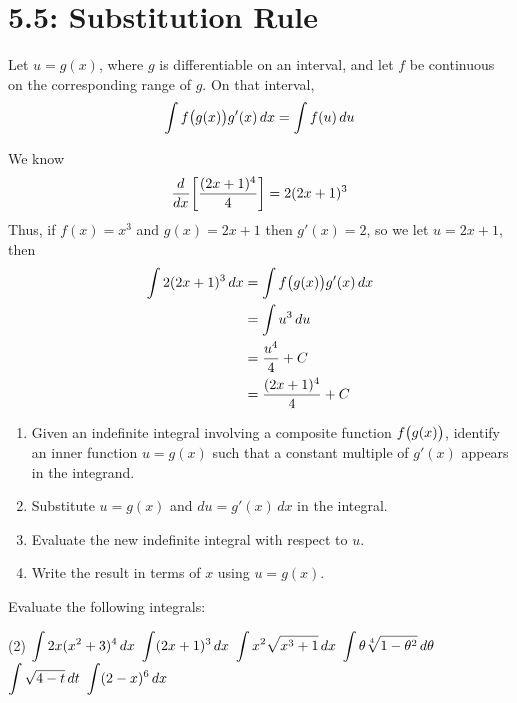 \documentclass[../mathNotesPreamble]{subfiles}
\begin{document}
\section{5.5: Substitution Rule}
\vspace*{-\baselineskip}
  \begin{thmBox*}
    Let $u=g(x)$, where $g$ is differentiable on an interval, and let $f$ be continuous on the corresponding range of $g$. On that interval,
    \[\int f{\left(g(x)\vphantom{g(x)^1}\right)}g'(x)\,dx=\int f(u)\,du\]
  \end{thmBox*}

  \begin{ex*}
    We know
      \[{\frac{d^{}}{dx^{}}}{\left[\frac{(2x+1)^4}{4}\right]}=2(2x+1)^3\]
    Thus, if $f(x)=x^3$ and $g(x)=2x+1$ then $g'(x)=2$, so we let $u=2x+1$, then
    \begin{align*}
      \int 2(2x+1)^3\,dx&=\int f{\left(g(x)\vphantom{g(x)^1}\right)}g'(x)\,dx\\
        &=\int u^3\,du\\
        &=\frac{u^4}{4}+C\\
        &=\frac{(2x+1)^4}{4}+C
    \end{align*}
  \end{ex*}
  
  \begin{thmBox*}
    \begin{enumerate}
      \item Given an indefinite integral involving a composite function $f{\left(g(x)\vphantom{g(x)^1}\right)}$, identify an inner function $u=g(x)$ such that a constant multiple of $g'(x)$ appears in the integrand.
      \item Substitute $u=g(x)$ and $du=g'(x)\,dx$ in the integral.
      \item Evaluate the new indefinite integral with respect to $u$.
      \item Write the result in terms of $x$ using $u=g(x)$.
    \end{enumerate}
  \end{thmBox*}
  \pagebreak
  
  \begin{ex*}
    Evaluate the following integrals:
  \end{ex*}
  \begin{tasks}[after-item-skip=\stretch{1}](2)
    \task $\displaystyle\int 2x(x^2+3)^4\,dx$
    \task $\displaystyle\int (2x+1)^3\, dx$
    \task $\displaystyle\int x^2\sqrt{x^3+1}\, dx$
    \task $\displaystyle\int \theta\sqrt[4]{1-\theta^2}\,d\theta$
    \task $\displaystyle\int\sqrt{4-t}\,dt$
    \task $\displaystyle\int (2-x)^6\,dx$
  \end{tasks}
  \pagebreak
  
\end{document}
